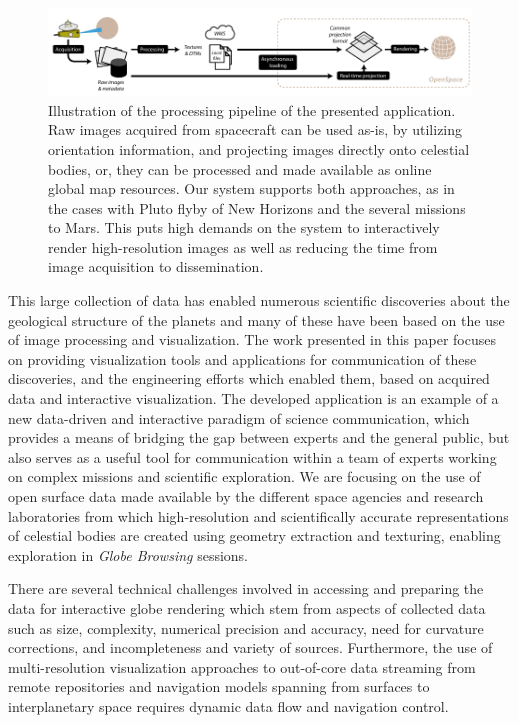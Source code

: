 \documentclass[journal]{vgtc}                %
\begin{document}
\begin{figure}
\includegraphics[width=\linewidth]{figures/overview.pdf}
\caption{Illustration of the processing pipeline of the presented application. Raw images acquired from spacecraft can be used as-is, by utilizing orientation information, and projecting images directly onto celestial bodies, or, they can be processed and made available as online global map resources. Our system supports both approaches, as in the cases with Pluto flyby of New Horizons and the several missions to Mars. This puts high demands on the system to interactively render high-resolution images as well as reducing the time from image acquisition to dissemination.}\vspace{-2mm}
\label{fig:procpipe}
\end{figure}

This large collection of data has enabled numerous scientific discoveries about the geological structure of the planets and many of these have been based on the use of image processing and visualization.
The work presented in this paper focuses on providing visualization tools and applications for communication of these discoveries, and the engineering efforts which enabled them, based on acquired data and interactive visualization.
The developed application is an example of a new data-driven and interactive paradigm of science communication, which provides a means of bridging the gap between experts and the general public, but also serves as a useful tool for communication within a team of experts working on complex missions and scientific exploration.
We are focusing on the use of open surface data made available by the different space agencies and research laboratories from which high-resolution and scientifically accurate representations of celestial bodies are created using geometry extraction and texturing, enabling exploration in \emph{Globe Browsing} sessions.

There are several technical challenges involved in accessing and preparing the data for interactive globe rendering which stem from aspects of collected data such as size, complexity, numerical precision and accuracy, need for curvature corrections, and incompleteness and variety of sources.
Furthermore, the use of multi-resolution visualization approaches to out-of-core data streaming from remote repositories and navigation models spanning from surfaces to interplanetary space requires dynamic data flow and navigation control. 
\end{document}
